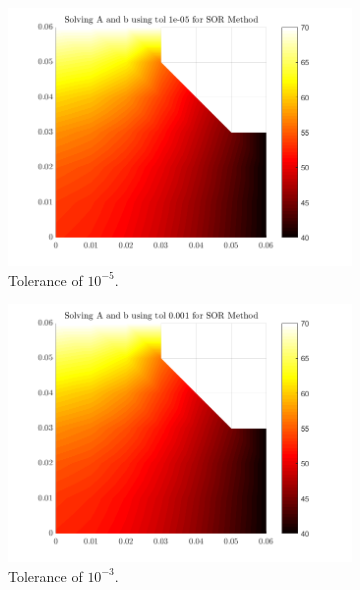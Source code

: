\documentclass[12pt,a4paper]{article}
\begin{document}
\begin{figure}[H]
	\centering
	\begin{subfigure}[b]{0.48\textwidth}
		\centering
		\includegraphics[width=\linewidth]{images/SORComparisontole-05.png}
		\caption{Tolerance of $10^{-5}$.}
		\label{fig:SORtole-05}
	\end{subfigure}
	\hfill
	\begin{subfigure}[b]{0.48\textwidth}
		\centering
		\includegraphics[width=\linewidth]{images/SORComparisontol0-001.png}
		\caption{Tolerance of $10^{-3}$.}
		\label{fig:SORtol0.001}
	\end{subfigure}
	\hfill
	\begin{subfigure}[b]{0.48\textwidth}
		\centering

\end{subfigure}
\end{figure}
\end{document}
